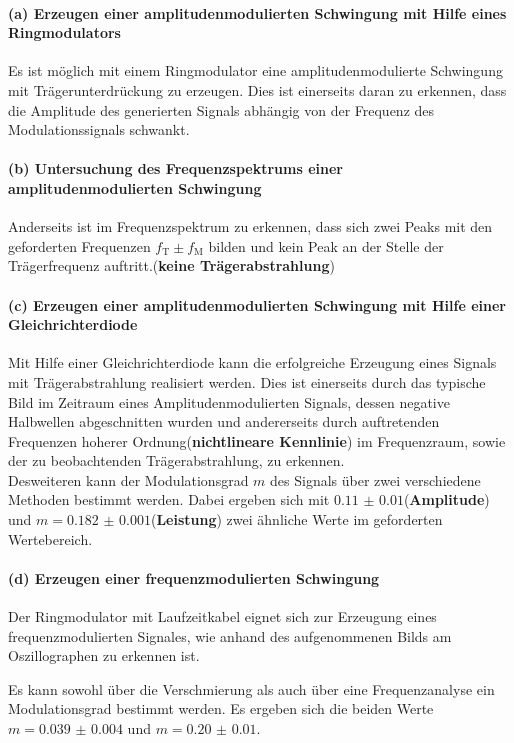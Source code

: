 \paragraph{(a) Erzeugen einer amplitudenmodulierten Schwingung mit
Hilfe eines Ringmodulators}
Es ist möglich mit einem Ringmodulator
eine amplitudenmodulierte Schwingung
mit Trägerunterdrückung zu erzeugen.
Dies ist einerseits daran zu erkennen,
dass die Amplitude des generierten Signals abhängig
von der Frequenz des Modulationssignals schwankt.

\paragraph{(b) Untersuchung des Frequenzspektrums einer
amplitudenmodulierten Schwingung}
Anderseits ist im Frequenzspektrum zu erkennen, dass sich zwei
Peaks mit den geforderten Frequenzen $f_{\text{T}}\pm f_{\text{M}}$
bilden
und kein Peak an der Stelle der Trägerfrequenz
auftritt.(\textbf{keine Trägerabstrahlung})

\paragraph{(c) Erzeugen einer amplitudenmodulierten Schwingung
mit Hilfe einer Gleichrichterdiode}
Mit Hilfe einer Gleichrichterdiode kann
die erfolgreiche Erzeugung eines Signals mit Trägerabstrahlung
realisiert werden.
Dies ist einerseits durch das typische Bild im Zeitraum eines
Amplitudenmodulierten Signals, dessen negative Halbwellen
abgeschnitten wurden
und andererseits durch auftretenden Frequenzen hoherer
Ordnung(\textbf{nichtlineare Kennlinie})
im Frequenzraum, sowie der zu beobachtenden
Trägerabstrahlung, zu erkennen. \\
Desweiteren kann der Modulationsgrad $m$ des Signals
über zwei verschiedene
Methoden bestimmt werden. Dabei ergeben sich mit
$\num{0.11(1)}$(\textbf{Amplitude}) und $m=\num{0.182(1)}$(\textbf{Leistung})
zwei ähnliche Werte
im geforderten Wertebereich.

\paragraph{(d) Erzeugen einer frequenzmodulierten Schwingung}
Der Ringmodulator mit Laufzeitkabel eignet sich zur Erzeugung
eines frequenzmodulierten Signales, wie anhand des aufgenommenen Bilds
am Oszillographen zu erkennen ist.

Es kann sowohl über
die Verschmierung als auch über eine Frequenzanalyse
ein Modulationsgrad bestimmt werden.
Es ergeben sich die beiden Werte
$m = \num{0.039(4)}$ und
$m=\num{0.20(1)}$.


